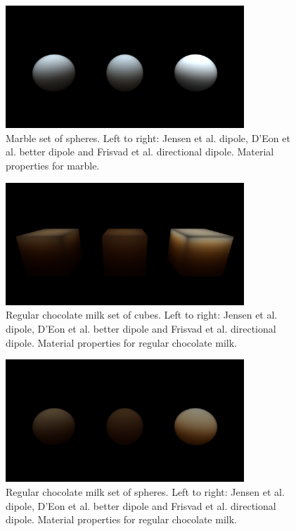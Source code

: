 \documentclass[12pt, twoside,a4paper, landscape]{article}
\begin{document}
\begin{figure}[here]
\centering
\includegraphics[width=0.8\textwidth]{marblespheres}
\caption{Marble set of spheres. Left to right: Jensen et al. dipole, D'Eon et al. better dipole and Frisvad et al. directional dipole. Material properties for marble.}
\end{figure}

\begin{figure}[here]
\centering
\includegraphics[width=0.8\textwidth]{chocolatecubes}
\caption{Regular chocolate milk set of cubes. Left to right: Jensen et al. dipole, D'Eon et al. better dipole and Frisvad et al. directional dipole. Material properties for regular chocolate milk.}
\end{figure}

\begin{figure}[here]
\centering
\includegraphics[width=0.8\textwidth]{chocolatespheres}
\caption{Regular chocolate milk set of spheres. Left to right: Jensen et al. dipole, D'Eon et al. better dipole and Frisvad et al. directional dipole. Material properties for regular chocolate milk.}
\end{figure}
\end{document}
